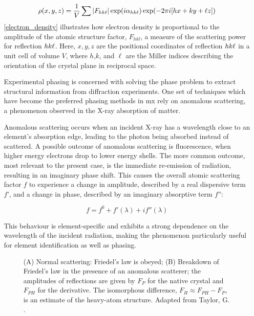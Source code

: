 \begin{equation}
    \rho(x,y,z)=\frac{1}{V} \sum |F_{hk\ell}| \exp(i\alpha_{hk\ell}) \exp(-2\pi i [hx+ky+\ell z]) \label{electron_density}
\end{equation}
\cref{electron_density} illustrates how electron density is proportional to the amplitude of the atomic structure factor, $F_{hkl}$, a measure of the scattering power for reflection $hk\ell$. Here, $x,y,z$ are the positional coordinates of reflection $hk\ell$ in a unit cell of volume $V$, where $h$,$k$, and $\ell$ are the Miller indices describing the orientation of the crystal plane in reciprocal space. %

Experimental phasing is concerned with solving the phase problem to extract structural information from diffraction experiments. One set of techniques which have become the preferred phasing methods in \ac{mx} rely on anomalous scattering, a phenomenon observed in the X-ray absorption of matter.

Anomalous scattering occurs when an incident X-ray has a wavelength close to an element’s absorption edge, leading to the photon being absorbed instead of scattered. A possible outcome of anomalous scattering is fluorescence, when higher energy electrons drop to lower energy shells. The more common outcome, most relevant to the present case, is the immediate re-emission of radiation, resulting in an imaginary phase shift. This causes the overall atomic scattering factor $f$ to experience a change in amplitude, described by a real dispersive term $f’$, and a change in phase, described by an imaginary absorptive term $f”$:

\begin{equation}
    f=f^0+f'(\lambda)+if''(\lambda) \label{total scattering}
\end{equation}

This behaviour is element-specific and exhibits a strong dependence on the wavelength of the incident radiation, making the phenomenon particularly useful for element identification as well as phasing.

\begin{figure}
    \centering
    
    \caption{(A) Normal scattering: Friedel's law is obeyed; (B) Breakdown of Friedel's law in the presence of an anomalous scatterer; the amplitudes of reflections are given by $F_P$ for the native crystal and $F_{PH}$ for the derivative. The isomorphous difference, $F_H \approx F_{PH} - F_P$, is an estimate of the heavy-atom structure. Adapted from Taylor, G. \cite{Taylor2003}.}
    \label{Breakdown of Friedel's law}
\end{figure}

